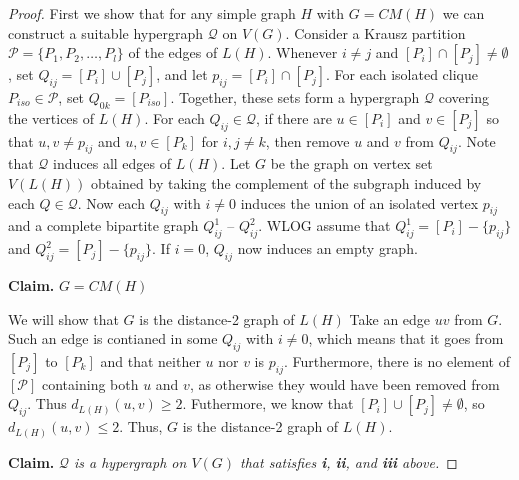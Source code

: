 \begin{proof}
	First we show that for any simple graph $H$ with $G = CM(H)$ we can construct a suitable hypergraph $\mathcal{Q}$ on $V(G)$.  Consider a Krausz partition $\mathcal{P} = \{P_1, P_2, \ldots, P_l\}$ of the edges of $L(H)$.  Whenever $i\neq j$ and $[P_i] \cap [P_j] \neq \emptyset$, set $Q_{ij} = [P_i]\cup [P_j]$, and let $p_{ij} =  [P_i]\cap [P_j]$.  For each isolated clique $P_{iso} \in \mathcal{P}$, set $Q_{0k} = [P_{iso}]$.   Together, these sets form a hypergraph $\mathcal{Q}$ covering the vertices  of $L(H)$.  For each $Q_{ij} \in \mathcal{Q}$, if there are $u \in [P_i]$ and $v \in [P_j]$ so that $u,v \neq p_{ij}$ and $u,v \in [P_k]$ for $i,j\neq k$, then remove $u$ and $v$ from $Q_{ij}$. Note that $\mathcal{Q}$ induces all edges of $L(H)$.  Let $G$ be the graph on vertex set $V(L(H))$ obtained by taking the complement of the subgraph induced by each $Q \in \mathcal{Q}$.  Now each  $Q_{ij}$ with $i \neq 0$ induces the union of an isolated vertex $p_{ij}$ and a complete bipartite graph $Q_{ij}^1$ -- $Q_{ij}^2$.  WLOG assume that $Q_{ij}^1 = [P_i]-\{p_{ij}\}$ and $Q_{ij}^2 = [P_j]-\{p_{ij}\}$. If $i = 0$, $Q_{ij}$ now induces an empty graph.   

\noindent\textbf{Claim. } \textit{$G = CM(H)$}

We will show that $G$ is the distance-2 graph of $L(H)$  Take an edge $uv$ from $G$.  Such an edge is contianed in some $Q_{ij}$ with $i \neq 0$, which means that it goes from $[P_j]$ to $[P_k]$ and that neither $u$ nor $v$ is $p_{ij}$.  Furthermore, there is no element of $[\mathcal{P}]$ containing both $u$ and $v$, as otherwise they would have been removed from $Q_{ij}$.  Thus $d_{L(H)}(u,v) \geq 2$.  Futhermore, we know that $[P_i]\cup [P_j] \neq \emptyset$, so $d_{L(H)}(u,v) \leq 2$.  Thus, $G$ is the distance-2 graph of $L(H)$.

\noindent\textbf{Claim. } \textit{$\mathcal{Q}$ is a hypergraph on $V(G)$ that satisfies \textbf{i}, \textbf{ii}, and \textbf{iii} above.}


\end{proof}
